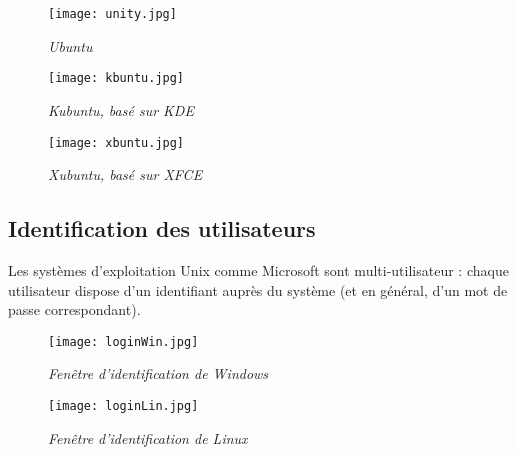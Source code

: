 \begin{figure}[h]
\begin{minipage}[c]{.33\linewidth}
\begin{center}
\texttt{[image: unity.jpg]}

\textit{Ubuntu}
\end{center}
\end{minipage} \hfill
\begin{minipage}[c]{.33\linewidth}
\begin{center}
\texttt{[image: kbuntu.jpg]}

\textit{Kubuntu, basé sur KDE}
\end{center}
\end{minipage} \hfill
\begin{minipage}[c]{.33\linewidth}

\begin{center}
\texttt{[image: xbuntu.jpg]}

\textit{Xubuntu, basé sur XFCE}
\end{center}
\end{minipage} 
\end{figure}

\subsection{Identification des utilisateurs}

Les systèmes d'exploitation Unix comme Microsoft sont multi-utilisateur : chaque utilisateur
dispose d'un identifiant auprès du système (et en général, d’un mot de passe correspondant).

\begin{figure}[h]
\begin{minipage}[c]{.49\linewidth}
\begin{center}
\texttt{[image: loginWin.jpg]}

\textit{Fenêtre d'identification de Windows}
\end{center}
\end{minipage} \hfill
\begin{minipage}[c]{.49\linewidth}
\begin{center}
\texttt{[image: loginLin.jpg]}

\textit{Fenêtre d'identification de Linux}
\end{center}
\end{minipage}
\end{figure}

